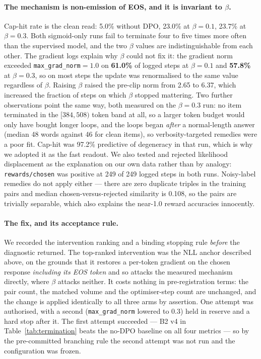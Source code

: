 \paragraph{The mechanism is non-emission of EOS, and it is invariant to $\beta$.}
Cap-hit rate is the clean read: 5.0\% without DPO, 23.0\% at $\beta=0.1$, 23.7\% at
$\beta=0.3$. Both sigmoid-only runs fail to terminate four to five times more often than
the supervised model, and the two $\beta$ values are indistinguishable from each other. The
gradient logs explain why $\beta$ could not fix it: the gradient norm exceeded
\texttt{max\_grad\_norm}${}=1.0$ on \textbf{61.0\%} of logged steps at $\beta=0.1$ and
\textbf{57.8\%} at $\beta=0.3$, so on most steps the update was renormalised to the same
value regardless of $\beta$. Raising $\beta$ raised the pre-clip norm from 2.65 to 6.37,
which increased the fraction of steps on which $\beta$ stopped mattering. Two further
observations point the same way, both measured on the $\beta=0.3$ run: no item terminated
in the $[384,508)$ token band at all, so a larger token budget would only have bought longer
loops, and the loops began \emph{after} a normal-length answer (median 48 words against 46
for clean items), so verbosity-targeted remedies were a poor fit. Cap-hit was 97.2\%
predictive of degeneracy in that run, which is why we adopted it as the fast readout. We also tested and rejected likelihood
displacement as the explanation on our own data rather than by analogy:
\texttt{rewards/chosen} was positive at 249 of 249 logged steps in both runs. Noisy-label
remedies do not apply either --- there are zero duplicate triples in the training pairs and
median chosen-versus-rejected similarity is 0.108, so the pairs are trivially separable,
which also explains the near-1.0 reward accuracies innocently.

\paragraph{The fix, and its acceptance rule.} We recorded the intervention ranking and a
binding stopping rule \emph{before} the diagnostic returned. The top-ranked intervention
was the NLL anchor described above, on the grounds that it restores a per-token gradient on
the chosen response \emph{including its EOS token} and so attacks the measured mechanism
directly, where $\beta$ attacks neither. It costs nothing in pre-registration terms: the
pair count, the matched volume and the optimiser-step count are unchanged, and the change is
applied identically to all three arms by assertion. One attempt was authorised, with a
second (\texttt{max\_grad\_norm} lowered to 0.3) held in reserve and a hard stop after it.
The first attempt succeeded --- B2 v4 in Table~\ref{tab:termination} beats the no-DPO
baseline on all four metrics --- so by the pre-committed branching rule the second attempt
was not run and the configuration was frozen.


